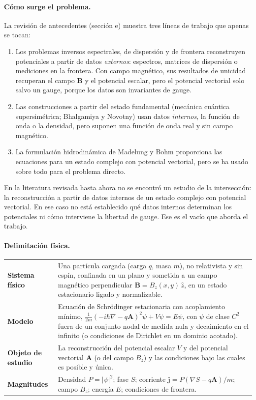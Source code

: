 \documentclass[12pt,letterpaper]{article}
\newcommand{\jv}{\mathbf{j}}
\newcommand{\Av}{\mathbf{A}}
\newcommand{\Bv}{\mathbf{B}}
\newcommand{\grad}{\nabla}
\begin{document}
\paragraph{Cómo surge el problema.} La revisión de antecedentes (sección e) muestra tres líneas de trabajo que
apenas se tocan:
\begin{enumerate}[leftmargin=1.8em]
  \item Los problemas inversos espectrales, de dispersión y de frontera reconstruyen potenciales a partir de datos
        \emph{externos}: espectros, matrices de dispersión o mediciones en la frontera. Con campo magnético, sus resultados
        de unicidad recuperan el campo $\Bv$ y el potencial escalar, pero el potencial vectorial solo salvo un gauge,
        porque los datos son invariantes de gauge.
  \item Las construcciones a partir del estado fundamental (mecánica cuántica supersimétrica; Bhalgamiya y Novotny)
        usan datos \emph{internos}, la función de onda o la densidad, pero suponen una función de onda real y sin campo
        magnético.
  \item La formulación hidrodinámica de Madelung y Bohm proporciona las ecuaciones para un estado complejo con potencial
        vectorial, pero se ha usado sobre todo para el problema directo.
\end{enumerate}
En la literatura revisada hasta ahora no se encontró un estudio de la intersección: la reconstrucción a partir de datos
internos de un estado complejo con potencial vectorial. En ese caso no está establecido qué datos internos determinan los
potenciales ni cómo interviene la libertad de gauge. Ese es el vacío que aborda el trabajo.

\paragraph{Delimitación física.}
\begin{center}
\begin{tabular}{@{}p{3.6cm} p{11cm}@{}}
\toprule
\textbf{Sistema físico} & Una partícula cargada (carga $q$, masa $m$), no relativista y sin espín, confinada en un plano
y sometida a un campo magnético perpendicular $\Bv=B_z(x,y)\,\hat z$, en un estado estacionario ligado y normalizable. \\
\textbf{Modelo} & Ecuación de Schrödinger estacionaria con acoplamiento mínimo,
$\frac{1}{2m}(-i\hbar\grad-q\Av)^2\psi+V\psi=E\psi$, con $\psi$ de clase $C^2$ fuera de un conjunto nodal de medida nula
y decaimiento en el infinito (o condiciones de Dirichlet en un dominio acotado). \\
\textbf{Objeto de estudio} & La reconstrucción del potencial escalar $V$ y del potencial vectorial $\Av$ (o del campo
$B_z$) y las condiciones bajo las cuales es posible y única. \\
\textbf{Magnitudes} & Densidad $P=|\psi|^2$; fase $S$; corriente $\jv=P(\grad S-q\Av)/m$; campo $B_z$; energía $E$;
condiciones de frontera. \\
\bottomrule
\end{tabular}
\end{center}
\end{document}
